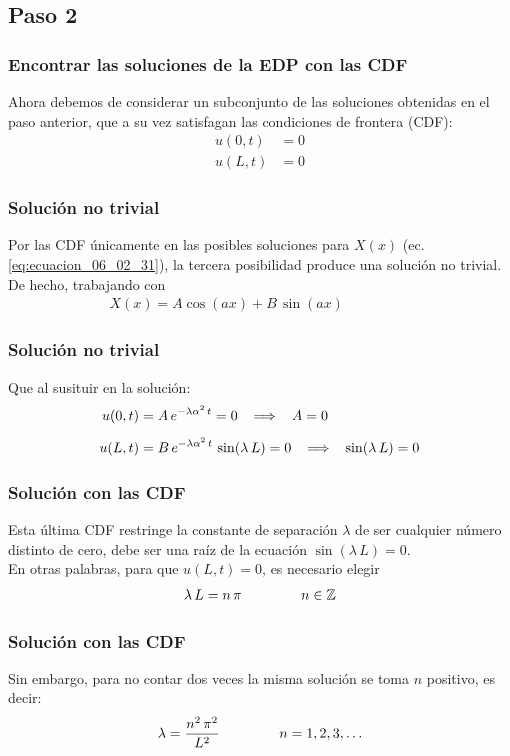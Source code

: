 \subsection{Paso 2}
\begin{frame}
\frametitle{Encontrar las soluciones de la EDP con las CDF}
Ahora debemos de considerar un subconjunto de las soluciones obtenidas en el paso anterior, que a su vez satisfagan las condiciones de frontera (CDF):
\begin{align*}
u(0, t) &= 0 \\[0.5em]
u(L, t) &= 0
\end{align*}
\end{frame}
\begin{frame}
\frametitle{Solución no trivial}
Por las CDF únicamente en las posibles soluciones para $X(x)$ (ec. \ref{eq:ecuacion_06_02_31}), la tercera posibilidad produce una solución no trivial. De hecho, trabajando con
\begin{align*}
X(x) = A \cos (a x) + B \, \sin (a x) \hspace{2cm}
\end{align*}
\end{frame}
\begin{frame}
\frametitle{Solución no trivial}
Que al susituir en la solución:
\begin{align*}
u(0, t) &= A \, e^{-\lambda \alpha^{2} \, t} = 0 \hspace{0.3cm} \Longrightarrow \hspace{0.3cm} A = 0 \\[0.5em]
u(L, t) &= B \, e^{-\lambda \alpha^{2} \, t} \, \sin (\lambda \, L) = 0 \hspace{0.3cm} \Longrightarrow \hspace{0.3cm} \sin (\lambda \, L) = 0
\end{align*}
\end{frame}
\begin{frame}
\frametitle{Solución con las CDF}
Esta última CDF restringe la constante de separación $\lambda$ de ser cualquier número distinto de cero, debe ser una raíz de la ecuación $\sin (\lambda \, L) = 0$.
\\
\bigskip
En otras palabras, para que $u(L, t) = 0$, es necesario elegir
\begin{align}
\lambda \, L = n \, \pi \hspace{1.5cm} n \in \mathbb{Z}
\label{eq:ecuacion_06_02_34}    
\end{align}
\end{frame}
\begin{frame}
\frametitle{Solución con las CDF}
Sin embargo, para no contar dos veces la misma solución se toma $n$ positivo, es decir:
\begin{align}
\lambda = \dfrac{n^{2} \, \pi^{2}}{L^{2}} \hspace{1.5cm} n = 1, 2, 3, \ldots
\label{eq:ecuacion_06_02_35}
\end{align}
\end{frame}
